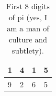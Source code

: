 \begin{table}[h!]
\begin{center}
    \begin{tabular}{l|l|l|l}
    1 & 4 & 1 & 5 \\ \hline
    9 & 2 & 6 & 5
    \end{tabular}
    \caption{First 8 digits of pi (yes, I am a man of culture and subtlety).}
\end{center}
\end{table}